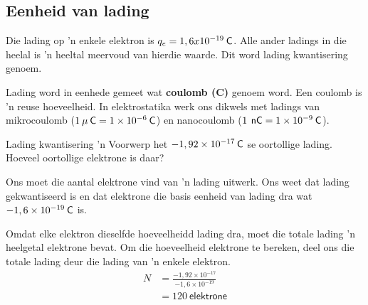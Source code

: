 \subsection{Eenheid van lading}

Die lading op 'n enkele elektron is ${q}_{e}=1,6x{10}^{-19}\phantom{\rule{2pt}{0ex}}\mathsf{C}$. Alle ander ladings in die heelal is 'n heeltal meervoud van hierdie waarde. Dit word lading kwantisering genoem.



Lading word in eenhede gemeet wat \textbf{coulomb (C)} genoem word. Een coulomb is 'n reuse hoeveelheid. In elektrostatika werk ons dikwels met ladings van mikrocoulomb ($1\phantom{\rule{2pt}{0ex}}\mu \phantom{\rule{2pt}{0ex}}\mathsf{C}=1\ensuremath{\times}{10}^{-6}\phantom{\rule{2pt}{0ex}}\mathsf{C}$) en nanocoulomb ($1\phantom{\rule{2pt}{0ex}}\phantom{\rule{2pt}{0ex}}\mathsf{nC}=1\ensuremath{\times}{10}^{-9}\phantom{\rule{2pt}{0ex}}\mathsf{C}$). \par

  
\begin{wex}{Lading kwantisering}
{
 'n Voorwerp het $-1,92\ensuremath{\times}{10}^{-17}\phantom{\rule{2pt}{0ex}}\mathsf{C}$ se oortollige lading. Hoeveel oortollige elektrone is daar?
}
{


Ons moet die aantal elektrone vind van 'n lading uitwerk. Ons weet dat lading gekwantiseerd is en dat elektrone die basis eenheid van lading dra wat $-1,6\ensuremath{\times}{10}^{-19}\phantom{\rule{2pt}{0ex}}\mathsf{C}$ is.



Omdat elke elektron dieselfde hoeveelheidd lading dra, moet die totale lading 'n heelgetal elektrone bevat. Om die hoeveelheid elektrone te bereken, deel ons die totale lading deur die lading van 'n enkele elektron.
\begin{align*}
N &= \frac{-1,92\ensuremath{\times}{10}^{-17}}{-1,6\ensuremath{\times}{10}^{-19}}\\ 
  &= 120~\mathsf{ elektrone}
\end{align*}
}
\end{wex}

